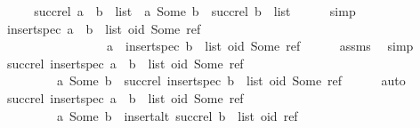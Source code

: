 \begin{isabellebody}
\ {\isacharminus}\isanewline
\ \ \isamarkupfalse%
\ {\isachardoublequoteopen}succ{\isacharunderscore}rel\ {\isacharparenleft}a\ {\isacharhash}\ b\ {\isacharhash}\ list{\isacharparenright}\ {\isacharequal}\ {\isacharbraceleft}{\isacharparenleft}a{\isacharcomma}\ Some\ b{\isacharparenright}{\isacharbraceright}\ {\isasymunion}\ succ{\isacharunderscore}rel\ {\isacharparenleft}b\ {\isacharhash}\ list{\isacharparenright}{\isachardoublequoteclose}\isanewline
\ \ \ \ \isamarkupfalse%
\ simp\isanewline
\ \ \isamarkupfalse%
\ \isamarkupfalse%
\ {\isachardoublequoteopen}insert{\isacharunderscore}spec\ {\isacharparenleft}a\ {\isacharhash}\ b\ {\isacharhash}\ list{\isacharparenright}\ {\isacharparenleft}oid{\isacharcomma}\ Some\ ref{\isacharparenright}\ {\isacharequal}\isanewline
\ \ \ \ \ \ \ \ \ \ \ \ \ \ \ \ \ a\ {\isacharhash}\ {\isacharparenleft}insert{\isacharunderscore}spec\ {\isacharparenleft}b\ {\isacharhash}\ list{\isacharparenright}\ {\isacharparenleft}oid{\isacharcomma}\ Some\ ref{\isacharparenright}{\isacharparenright}{\isachardoublequoteclose}\isanewline
\ \ \ \ \isamarkupfalse%
\ assms{\isacharparenleft}{}{\isacharparenright}\ \isamarkupfalse%
\ simp\isanewline
\ \ \isamarkupfalse%
\ {\isachardoublequoteopen}succ{\isacharunderscore}rel\ {\isacharparenleft}insert{\isacharunderscore}spec\ {\isacharparenleft}a\ {\isacharhash}\ b\ {\isacharhash}\ list{\isacharparenright}\ {\isacharparenleft}oid{\isacharcomma}\ Some\ ref{\isacharparenright}{\isacharparenright}\ {\isacharequal}\isanewline
\ \ \ \ \ \ \ \ \ {\isacharbraceleft}{\isacharparenleft}a{\isacharcomma}\ Some\ b{\isacharparenright}{\isacharbraceright}\ {\isasymunion}\ succ{\isacharunderscore}rel\ {\isacharparenleft}insert{\isacharunderscore}spec\ {\isacharparenleft}b\ {\isacharhash}\ list{\isacharparenright}\ {\isacharparenleft}oid{\isacharcomma}\ Some\ ref{\isacharparenright}{\isacharparenright}{\isachardoublequoteclose}\isanewline
\ \ \ \ \isamarkupfalse%
\ auto\isanewline
\ \ \isamarkupfalse%
\ {\isachardoublequoteopen}succ{\isacharunderscore}rel\ {\isacharparenleft}insert{\isacharunderscore}spec\ {\isacharparenleft}a\ {\isacharhash}\ b\ {\isacharhash}\ list{\isacharparenright}\ {\isacharparenleft}oid{\isacharcomma}\ Some\ ref{\isacharparenright}{\isacharparenright}\ {\isacharequal}\isanewline
\ \ \ \ \ \ \ \ \ {\isacharbraceleft}{\isacharparenleft}a{\isacharcomma}\ Some\ b{\isacharparenright}{\isacharbraceright}\ {\isasymunion}\ insert{\isacharunderscore}alt\ {\isacharparenleft}succ{\isacharunderscore}rel\ {\isacharparenleft}b\ {\isacharhash}\ list{\isacharparenright}{\isacharparenright}\ {\isacharparenleft}oid{\isacharcomma}\ ref{\isacharparenright}{\isachardoublequoteclose}\isanewline

\end{isabellebody}
